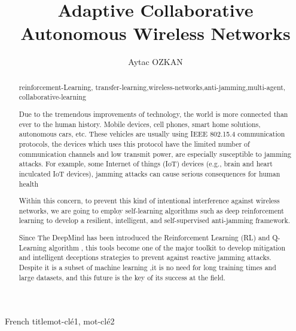 \documentclass[letterpaper%
, twoside%
, 12pt%
,thesepararticles%
, english%
,creativecommons,hyperref, withAlgo2e%
]{thETS}
\title{Adaptive Collaborative  Autonomous Wireless Networks}
\author{Aytac OZKAN}
\begin{document}

\maketitle

\presentjury

\begin{foreword}

\lipsum[1] %

\end{foreword}



\begin{acknowledgements}

\lipsum[1] %


\end{acknowledgements}



\begin{summary}{French title}{mot-clé1, mot-clé2}

\lipsum[1] %

\end{summary}


\begin{abstract}{reinforcement-Learning, transfer-learning,wireless-networks,anti-jamming,multi-agent, collaborative-learning}

Due to the tremendous improvements of technology, the world is more connected than ever to the human history. Mobile devices, cell phones, smart home solutions, autonomous cars, etc. These vehicles are usually using IEEE 802.15.4 communication protocols, the devices which uses this protocol have the limited number of communication channels and low transmit power, are especially susceptible to jamming attacks. For example, some Internet of things (IoT) devices (e.g., brain and heart inculcated IoT devices), jamming attacks can cause serious consequences for human health

Within this concern, to prevent this kind of intentional interference against wireless networks, we are going to employ self-learning algorithms such as deep reinforcement learning to develop a resilient, intelligent, and self-supervised anti-jamming framework.

 Since The DeepMind has been introduced the Reinforcement Learning (RL) and Q-Learning algorithm \cite{ACM:HasseltetSilver}, this tools become one of the major toolkit to develop mitigation and intelligent deceptions strategies to prevent against reactive jamming attacks. Despite it is a subset of machine learning \cite{Kasturi2020MachineLR},it is no need for long training times and large datasets, and this future is the key of its success at the field. 

\end{abstract}
\end{document}
